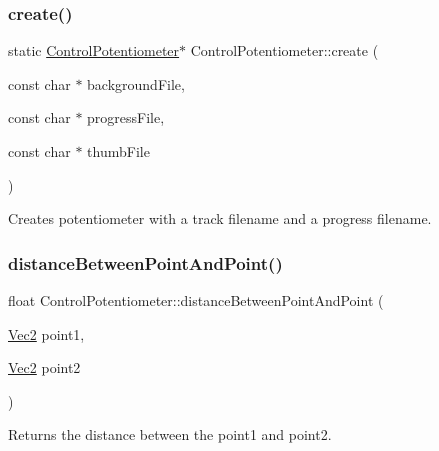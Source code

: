 \subsubsection{\texorpdfstring{create()}{create()}\hspace{0.1cm}{\footnotesize\ttfamily [2/2]}}
{\footnotesize\ttfamily static \hyperlink{classControlPotentiometer}{Control\+Potentiometer}$\ast$ Control\+Potentiometer\+::create (\begin{DoxyParamCaption}\item[{const char $\ast$}]{background\+File,  }\item[{const char $\ast$}]{progress\+File,  }\item[{const char $\ast$}]{thumb\+File }\end{DoxyParamCaption})\hspace{0.3cm}{\ttfamily [static]}}

Creates potentiometer with a track filename and a progress filename. \mbox{\label{classControlPotentiometer_a4169e6c12a675aafd77d576acdaa837d}} 
\subsubsection{\texorpdfstring{distance\+Between\+Point\+And\+Point()}{distanceBetweenPointAndPoint()}\hspace{0.1cm}{\footnotesize\ttfamily [1/2]}}
{\footnotesize\ttfamily float Control\+Potentiometer\+::distance\+Between\+Point\+And\+Point (\begin{DoxyParamCaption}\item[{\hyperlink{classVec2}{Vec2}}]{point1,  }\item[{\hyperlink{classVec2}{Vec2}}]{point2 }\end{DoxyParamCaption})}

Returns the distance between the point1 and point2. \mbox{\label{classControlPotentiometer_a4169e6c12a675aafd77d576acdaa837d}} 
